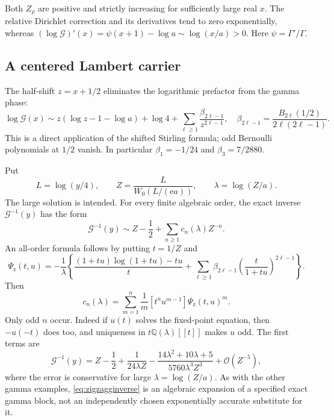 \documentclass[11pt,a4paper]{article}
\theoremstyle{definition}
\theoremstyle{remark}
\newcommand{\ee}{\mathrm e}
\newcommand{\QQ}{\mathbb Q}
\newcommand{\OO}{\mathcal O}
\newcommand{\coef}[1]{\left[#1\right]}
\numberwithin{equation}{section}
\begin{document}
Both $Z_\rho$ are positive and strictly increasing for sufficiently large real $x$. The relative Dirichlet correction and its derivatives tend to zero exponentially, whereas
$(\log\mathcal G)'(x)=\psi(x+1)-\log a\sim\log(x/a)>0$.
Here $\psi=\Gamma'/\Gamma$.

\subsection{A centered Lambert carrier}
The half-shift $z=x+1/2$ eliminates the logarithmic prefactor from the gamma phase:
\begin{equation}
 \log\mathcal G(x)\sim z(\log z-1-\log a)+\log4
 +\sum_{\ell\ge1}\frac{\beta_{2\ell-1}}{z^{2\ell-1}},
 \quad
 \beta_{2\ell-1}=\frac{B_{2\ell}(1/2)}{2\ell(2\ell-1)}.
 \label{eq:zigzagphase}
\end{equation}
This is a direct application of the shifted Stirling formula; odd Bernoulli polynomials at $1/2$ vanish. In particular $\beta_1=-1/24$ and $\beta_3=7/2880$.

Put
\begin{equation}
 L=\log(y/4),\qquad
 Z=\frac{L}{W_0(L/(\ee a))},\qquad
 \lambda=\log(Z/a).
 \label{eq:zigzagcore}
\end{equation}
The large solution is intended. For every finite algebraic order, the exact inverse $\mathcal G^{-1}(y)$ has the form
\begin{equation}
 \mathcal G^{-1}(y)\sim Z-\frac12+
 \sum_{n\ge1}c_n(\lambda)Z^{-n}.
 \label{eq:zigzagginverse}
\end{equation}
An all-order formula follows by putting $t=1/Z$ and
\begin{equation}
 \Psi_{\mathrm z}(t,u)=-\frac1\lambda\left\{
 \frac{(1+tu)\log(1+tu)-tu}{t}
 +\sum_{\ell\ge1}\beta_{2\ell-1}
 \left(\frac{t}{1+tu}\right)^{2\ell-1}\right\}.
 \label{eq:zigzagpsi}
\end{equation}
Then
\begin{equation}
 c_n(\lambda)=\sum_{m=1}^n\frac1m
 \coef{t^n u^{m-1}}\Psi_{\mathrm z}(t,u)^m.
 \label{eq:zigzagcoeff}
\end{equation}
Only odd $n$ occur. Indeed if $u(t)$ solves the fixed-point equation, then $-u(-t)$ does too, and uniqueness in $t\QQ(\lambda)[[t]]$ makes $u$ odd. The first terms are
\begin{equation}
 \mathcal G^{-1}(y)=Z-\frac12+\frac1{24\lambda Z}
 -\frac{14\lambda^2+10\lambda+5}{5760\lambda^3 Z^3}
 +\OO(Z^{-5}),
 \label{eq:zigzagfirst}
\end{equation}
where the error is conservative for large $\lambda=\log(Z/a)$. As with the other gamma examples, \eqref{eq:zigzagginverse} is an algebraic expansion of a specified exact gamma block, not an independently chosen exponentially accurate substitute for it.
\end{document}
